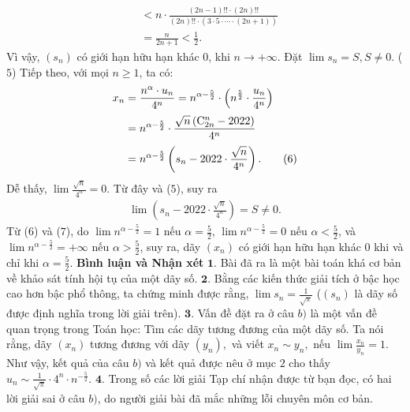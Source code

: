 \begin{multicols}{2}
\begin{align*}
		&< n \cdot \frac{{\left( {2n - 1} \right)!! \cdot \left( {2n} \right)!!}}{{\left( {2n} \right)!! \cdot \left( {3 \cdot 5 \cdot  \cdots  \cdot \left( {2n + 1} \right)} \right)}} \\[0.5ex]
		&= \frac{n}{{2n + 1}} < \frac{1}{2}.
	\end{align*}
	Vì vậy, $(s_n)$  có giới hạn hữu hạn khác $0$, khi $n \to +\infty$.  Đặt $\lim {s_n} = S,   S \ne  0$.  \hfill                                 ($5$)
	\vskip 0.05cm
	Tiếp theo, với mọi $n \ge  1$, ta có:
	\begin{align*}
		{x_n} &= \frac{{{n^\alpha } \cdot {u_n}}}{{{4^n}}} = {n^{\alpha  - \frac{5}{2}}} \cdot \left( {{n^{\frac{5}{2}}} \cdot \frac{{{u_n}}}{{{4^n}}}} \right) \\[0.5ex]
		&= {n^{\alpha  - \frac{5}{2}}} \cdot \frac{{\sqrt n \left( {{\rm{C}}_{2n}^n - 2022} \right)}}{{{4^n}}} \\[0.5ex]
		&= {n^{\alpha  - \frac{5}{2}}}\left( {{s_n} - 2022 \cdot \frac{{\sqrt n }}{{{4^n}}}} \right). \tag{$6$}
	\end{align*}
	Dễ thấy, $\lim \frac{{\sqrt n }}{{{4^n}}} = 0.$  Từ đây và ($5$), suy ra
	\begin{align*}
		\lim \left( {{s_n} - 2022 \cdot \frac{{\sqrt n }}{{{4^n}}}} \right) = S \ne 0. \tag{$7$}
	\end{align*}
	Từ ($6$) và ($7$), do $\lim {n^{\alpha  - \frac{5}{2}}} = 1$  nếu $\alpha  = \frac{5}{2}$, $\lim {n^{\alpha  - \frac{5}{2}}} = 0$  nếu  $\alpha  < \frac{5}{2}$, và $\lim {n^{\alpha  - \frac{5}{2}}} =  + \infty $  nếu  $\alpha  > \frac{5}{2}$, suy ra, dãy $(x_n)$  có giới hạn hữu hạn khác $0$ khi và chỉ khi  $\alpha  = \frac{5}{2}$.
	\vskip 0.05cm
	\textbf{\color{thachthuctoanhoc}Bình luận và Nhận xét}
	\vskip 0.05cm
	$\pmb{1.}$ Bài đã ra là một bài toán khá cơ bản về khảo sát tính hội tụ của một dãy số.
	\vskip 0.05cm
	$\pmb{2.}$ Bằng các kiến thức giải tích ở bậc học cao hơn bậc phổ thông, ta chứng minh được rằng, $\lim {s_n} = \frac{1}{{\sqrt \pi  }}$   ($(s_n)$  là dãy số được định nghĩa trong lời giải trên).
	\vskip 0.05cm
	$\pmb{3.}$ Vấn đề đặt ra ở câu $b)$ là một vấn đề quan trọng trong Toán học: Tìm các dãy tương đương của một dãy số.
	\vskip 0.05cm
	Ta nói rằng, dãy $\left( {{x_n}} \right)$  tương đương với dãy $\left( {{y_n}} \right),$  và viết  ${x_n} \sim {y_n},$ nếu  $\lim \frac{{{x_n}}}{{{y_n}}} = 1.$
	\vskip 0.05cm
	Như vậy, kết quả của câu $b)$ và kết quả được nêu ở mục $2$ cho thấy ${u_n} \sim \frac{1}{{\sqrt \pi  }} \cdot {4^n} \cdot {n^{ - \frac{5}{2}}}.$
	\vskip 0.05cm 
	$\pmb{4.}$ Trong số các lời giải Tạp chí nhận được từ bạn đọc, có hai lời giải sai ở câu $b)$, do người giải bài đã mắc những lỗi chuyên môn cơ bản.

\end{multicols}
